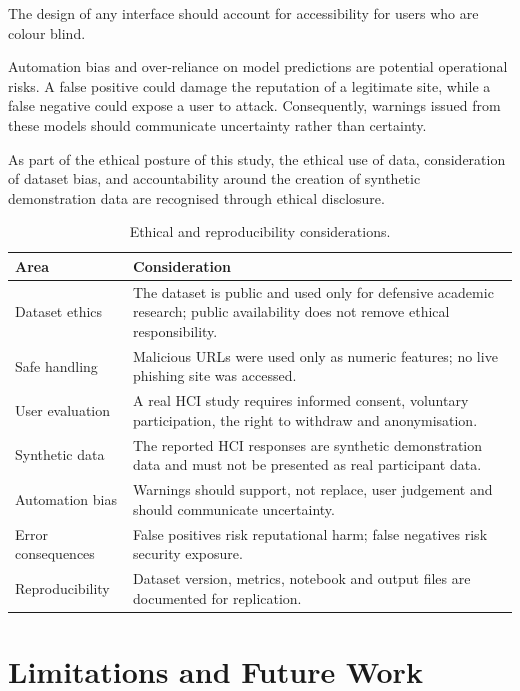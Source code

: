 \documentclass[11pt,a4paper]{article}
\begin{document}
The design of any interface should account for accessibility for users who are colour blind.

Automation bias and over-reliance on model predictions are potential operational risks. A false
positive could damage the reputation of a legitimate site, while a false negative could expose a
user to attack. Consequently, warnings issued from these models should communicate uncertainty
rather than certainty.

As part of the ethical posture of this study, the ethical use of data, consideration of dataset
bias, and accountability around the creation of synthetic demonstration data are recognised
through ethical disclosure.

\begin{table}[H]
\caption{Ethical and reproducibility considerations.}
\label{tab:ethics}
\centering\footnotesize
\begin{tabularx}{\textwidth}{p{3.2cm} L}
\toprule
\textbf{Area} & \textbf{Consideration} \\
\midrule
Dataset ethics & The dataset is public and used only for defensive academic research; public
availability does not remove ethical responsibility. \\
Safe handling & Malicious URLs were used only as numeric features; no live phishing site was
accessed. \\
User evaluation & A real HCI study requires informed consent, voluntary participation, the right
to withdraw and anonymisation. \\
Synthetic data & The reported HCI responses are synthetic demonstration data and must not be
presented as real participant data. \\
Automation bias & Warnings should support, not replace, user judgement and should communicate
uncertainty. \\
Error consequences & False positives risk reputational harm; false negatives risk security
exposure. \\
Reproducibility & Dataset version, metrics, notebook and output files are documented for
replication. \\
\bottomrule
\end{tabularx}
\end{table}

\section{Limitations and Future Work}
\end{document}
